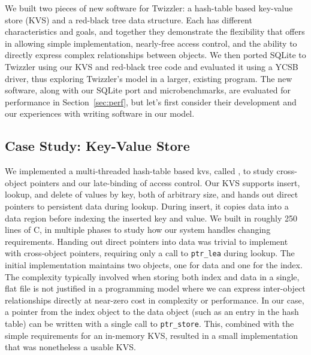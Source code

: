 We built two pieces of new software for Twizzler: a hash-table based key-value store (KVS) and a red-black tree
data structure.  Each has different characteristics and goals, and together they demonstrate the flexibility that
\Twizzler offers in allowing simple implementation, nearly-free access control, and the ability to directly express
complex relationships between objects.  We then ported SQLite to Twizzler using
our KVS and red-black tree code and evaluated it using a YCSB~\cite{ycsb,ycsbc} driver, thus exploring Twizzler's
model in a larger, existing program. The new software, along with our SQLite port and
microbenchmarks, are evaluated for performance in Section~\ref{sec:perf}, but let's first consider their development and our experiences with writing software in our model.


\subsection{Case Study: Key-Value Store}


\label{sec:kv}

We implemented a multi-threaded hash-table based \ac{kvs}, called \nvkv, to
study cross-object pointers and our late-binding of access control.
Our KVS supports insert, lookup, and delete of values by key, both of arbitrary size, and hands
out direct pointers to persistent data during lookup. During insert, it copies data into a data
region before indexing the inserted key and value.
We built \nvkv in roughly 250 lines of C\@, in multiple phases to study how our system handles changing requirements. Handing
out direct pointers into data was trivial to implement with cross-object pointers, requiring
only a call to \texttt{ptr\_lea} during lookup. The initial implementation maintains two
objects, one for data and one for the index.  The complexity typically involved when storing both
index and data in a single, flat file is not justified in a programming
model where we can express inter-object relationships directly at
near-zero cost in complexity or performance. In our case, a pointer from the index object
to the data object (such as an entry in the hash table) can be written with a single call to
\texttt{ptr\_store}.
This, combined with the simple requirements for an in-memory \NVM KVS,
resulted in a small implementation that was nonetheless a
usable KVS.

